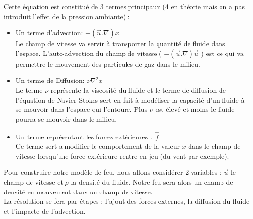 \documentclass[a4paper,10pt]{article}
\begin{document}
Cette équation est constitué de 3 termes principaux (4 en théorie mais
on a pas introduit l'effet de la pression ambiante) :\\
\begin{itemize}
\item{Un terme d'advection: $-(\vec{u}.\nabla)x$}\\ Le champ de
  vitesse va servir à transporter la quantité de fluide dans
  l'espace. L'auto-advection du champ de vitesse (
  $-(\vec{u}.\nabla)\vec{u}$ ) est ce qui va permettre le mouvement
  des particules de gaz dans le milieu.\\
\item{Un terme de Diffusion: $\nu{\nabla^2}x$}\\ Le terme $\nu$
  représente la viscosité du fluide et le terme de diffusion de
  l'équation de Navier-Stokes sert en fait à modéliser la capacité
  d'un fluide à se mouvoir dans l'espace qui l'entoure. Plus $\nu$ est
  élevé et moins le fluide pourra se mouvoir dans le milieu.\\
\item{Un terme représentant les forces extérieures : $\vec{f}$}\\ Ce
  terme sert a modifier le comportement de la valeur $x$ dans le champ
  de vitesse lorsqu'une force extérieure rentre en jeu (du vent par
  exemple).\\
\end{itemize}
Pour construire notre modèle de feu, nous allons considérer 2
variables : $\vec{u}$ le champ de vitesse et $\rho$ la densité du
fluide. Notre feu sera alors un champ de densité en mouvement dans un
champ de vitesse.\\ 

La résolution se fera par étapes : l'ajout des forces externes, la
diffusion du fluide et l'impacte de l'advection.\\
\end{document}
